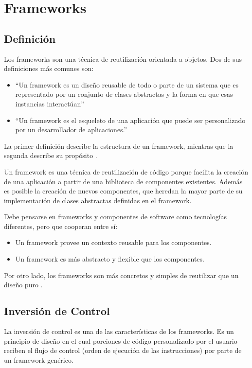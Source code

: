 
\section{Frameworks}


\subsection{Definición}

Los frameworks son una técnica de reutilización orientada a objetos. Dos de sus
definiciones más comunes son:
\begin{itemize}
  \item ``Un framework es un diseño reusable de todo o parte de un sistema que es
  representado por un conjunto de clases abstractas y la forma en que esas
  instancias interactúan''
  \item ``Un framework es el esqueleto de una aplicación que puede ser
  personalizado por un desarrollador de aplicaciones.''
\end{itemize} 

 La primer definición describe la estructura de un framework, mientras que la
 segunda describe su propósito \cite{Johnson97}. 

Un framework es una técnica de reutilización de código porque facilita la
creación de una aplicación a partir de una biblioteca de componentes existentes.
Además es posible la creación de nuevos componentes, que heredan la mayor parte
de su implementación de clases abstractas definidas en el framework.

Debe pensarse en frameworks y componentes de software como tecnologías
diferentes, pero que cooperan entre sí:
\begin{itemize}
  \item Un framework provee un contexto reusable para los componentes.
  \item Un framework es más abstracto y flexible que los componentes.
\end{itemize} 

Por otro lado, los frameworks son más concretos y simples de reutilizar
que un diseño puro \cite{JohnsonFeb97}.

\subsection{Inversión de Control}
\label{sec:inversion_control}
La inversión de control es una de las características de los frameworks.
Es un principio de diseño en el cual porciones de código personalizado por el
usuario reciben el flujo de control (orden de ejecución de las instrucciones)
por parte de un framework genérico.

